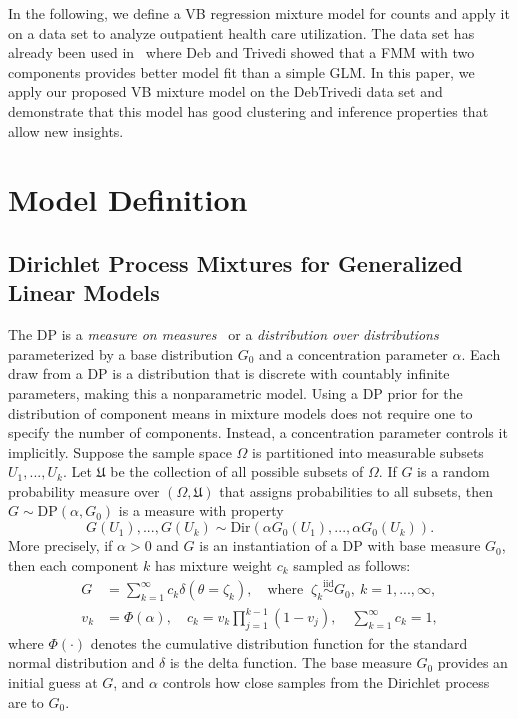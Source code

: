 \documentclass[a4paper,UKenglish]{oasics-v2016}
\begin{document}
In the following, we define a VB regression mixture model for counts and apply it on a data set to analyze outpatient health care utilization. The data set has already been used in~\cite{DebTrivedi} where Deb and Trivedi showed that a FMM with two components provides better model fit than a simple GLM. In this paper, we apply our proposed VB mixture model on the DebTrivedi data set and demonstrate that this model has good clustering and inference properties that allow new insights.

\section{Model Definition}
\subsection{Dirichlet Process Mixtures for Generalized Linear Models\label{s:dpp_models}}
The DP is a \emph{measure on measures}~\cite{blei2006} or a \emph{distribution over distributions}~\cite{sammut} parameterized by a base distribution $G_0$ and a concentration parameter $\alpha$. Each draw from a DP is a distribution that is discrete with countably infinite parameters, making this a nonparametric model.
Using a DP prior for the distribution of component means in mixture models does not require one to specify the number of components. Instead, a concentration parameter controls it implicitly.
Suppose the sample space $\Omega$ is partitioned into measurable subsets $U_1,...,U_k$. Let $\mathfrak{U}$ be the collection of all possible subsets of $\Omega$. If $G$ is a random probability measure over $(\Omega,\mathfrak{U})$ that assigns probabilities to all subsets, then $G\sim\text{DP}(\alpha, G_0)$ is a measure with property
$$
G(U_1),...,G(U_k) \sim \text{Dir}(\alpha G_0(U_1),..., \alpha G_0(U_k)).
$$
More precisely, if $\alpha>0$ and $G$ is an instantiation of a DP with base measure $G_0$, then each component $k$ has mixture weight $c_k$ sampled as follows:
\begin{align}
G&=\sum_{k=1}^{\infty}c_k \delta(\theta=\zeta_k),\quad \text{where    }\ \zeta_k \overset{\text{iid}}{\sim} G_0,\ k=1,...,\infty,\nonumber \\
v_k &= \Phi(\alpha), %
\quad c_k = v_k \prod_{j=1}^{k-1}(1-v_j),\quad \sum_{k=1}^{\infty}c_k=1,
\end{align}\label{eq:dp}
where $\Phi(\cdot)$ denotes the cumulative distribution function for the standard normal distribution and $\delta$ is the delta function. The base measure $G_0$ provides an initial guess at $G$, and $\alpha$ controls how close samples from the Dirichlet process are to $G_0$.
\end{document}
